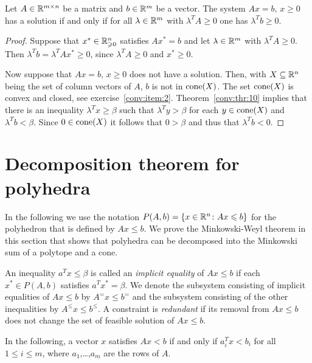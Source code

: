 \begin{theorem}
  \label{conv:thr:12}
  Let $A \in \mathbb{R}^{m\times n}$ be a matrix and $b \in \mathbb{R}^m$ be a vector. The
  system $Ax = b, \,x\geq0$ has a solution if and only if for all $\lambda \in
  \mathbb{R}^m$ with $\lambda^TA\geq0$ one has $\lambda^Tb \geq0$.  
\end{theorem}

\begin{proof}
  Suppose that $x^* \in \mathbb{R}^n_{\geqslant0}$ satisfies $Ax^* = b$ and let $\lambda \in
  \mathbb{R}^m$ with $\lambda^T A \geq0$. Then $\lambda^Tb = \lambda^TA x^* \geq0$, since
  $\lambda^TA\geq0$ and $x^*\geq0$. 

  Now suppose that $Ax = b, \,x\geq0$ does not have a solution. Then,
  with   $X\subseteq\mathbb{R}^n$ being  the set of column vectors of $A$, 
  $b$ is not in $\mathrm{cone}(X)$. The set $\mathrm{cone}(X)$ is convex and
  closed, see exercise~\ref{conv:item:2}. Theorem~\ref{conv:thr:10} implies 
  that there is an inequality $\lambda^Tx \geq \beta$ such that $\lambda^Ty > \beta$ for
  each $y \in \mathrm{cone}(X)$ and $\lambda^Tb < \beta$. Since $0 \in \mathrm{cone}(X)$ it follows that $0 > \beta$ and thus that
  $\lambda^Tb<0$. 
  
\end{proof}

\section{Decomposition theorem for polyhedra}
\label{sec:decomp-theor-polyh}

In the following we use the notation $P(A,b) = \{x \in\mathbb{R}^n \colon Ax \leqslant b\}$ for the polyhedron that is defined by $Ax \leq b$. We prove the Minkowski-Weyl theorem in this section that shows that polyhedra can be decomposed into the Minkowski sum of a polytope and a cone. 

\begin{definition}
\label{po:def:5}
An inequality $a^Tx\leq\beta$ is called an \emph{implicit equality} of
$Ax\leq b$ if each $x^* \in P(A,b)$ satisfies $a^Tx^* = \beta$. We denote the
subsystem  consisting of implicit equalities of $Ax\leq b$ by $A^=x\leq b^=$
and the subsystem consisting of the other inequalities by
$A^\leq x\leq b^\leq$. A constraint is \emph{redundant} if its removal from
$Ax\leq b$ does not change the set of feasible solution of $Ax\leq b$.  
\end{definition}

In the following, a vector $x$ satisfies $Ax < b$ if and only if
$a_i^T x < b_i$ for all $1\leq i\leq m$, where $a_1$,\ldots,$a_m$ are the rows of $A$.

